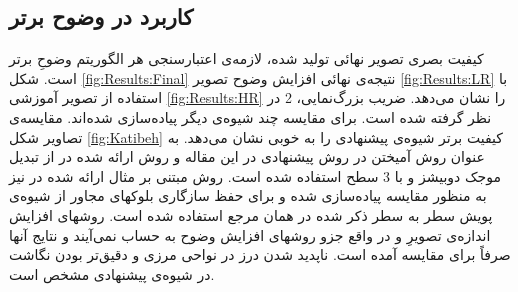 \documentclass[conference]{IEEEtran-ModifiedForMVIP}
\newcommand{\SR}{وضوحِ برتر}%
\newcommand{\fusion}{آمیختن}
\begin{document}
\subsection{کاربرد در وضوح برتر}
کیفیت بصری تصویر نهائی تولید شده، لازمه‌ی اعتبارسنجی هر الگوریتم \SR{} است. 
شکل \ref{fig:Results:Final} نتیجه‌ی نهائی افزایش وضوح تصویر \ref{fig:Results:LR} با استفاده از تصویر آموزشی \ref{fig:Results:HR} را
 نشان می‌دهد. ضریب بزرگ‌نمایی، 2 در نظر گرفته شده است. 
برای مقایسه‌ چند شیوه‌ی دیگر پیاده‌سازی شده‌اند. مقایسه‌ی تصاویر شکل \ref{fig:Katibeh} کیفیت برتر شیوه‌ی پیشنهادی را به خوبی نشان می‌دهد. به عنوان روش \fusion{} در روش پیشنهادی در این مقاله و روش ارائه شده در \cite{Amintoosi08reconstruction} از تبدیل موجک دوبیشز%
 و با 3 سطح استفاده شده است. روش مبتنی بر مثال ارائه شده در \cite{Freeman02example} نیز به منظور مقایسه پیاده‌سازی شده و برای حفظ سازگاری بلوکهای مجاور از شیوه‌ی پویش سطر به سطر ذکر شده در همان مرجع استفاده شده است. روشهای افزایش اندازه‌ی تصویرِ  و  در واقع جزو روشهای افزایش وضوح به حساب نمی‌آیند و نتایج آنها صرفاً برای مقایسه آمده است. ناپدید شدن درز در نواحی مرزی و دقیق‌تر بودن نگاشت در شیوه‌ی پیشنهادی مشخص است.
\end{document}
